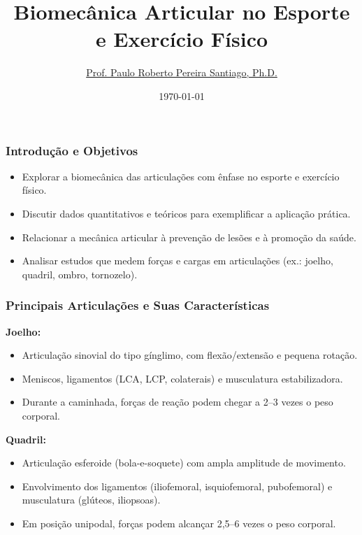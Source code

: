 \documentclass{beamer}
\title{Biomecânica Articular no Esporte e Exercício Físico}
\author{\href{https://uspdigital.usp.br/jupiterweb/obterDisciplina?sgldis=REF0158&verdis=1}{Prof. Paulo Roberto Pereira Santiago, Ph.D.}}
\date{\today}
\begin{document}
\frame{\titlepage}

\begin{frame}
\frametitle{Introdução e Objetivos}
\begin{itemize}
    \item Explorar a biomecânica das articulações com ênfase no esporte e exercício físico.
    \item Discutir dados quantitativos e teóricos para exemplificar a aplicação prática.
    \item Relacionar a mecânica articular à prevenção de lesões e à promoção da saúde.
    \item Analisar estudos que medem forças e cargas em articulações (ex.: joelho, quadril, ombro, tornozelo).
\end{itemize}
\end{frame}

\begin{frame}
\frametitle{Principais Articulações e Suas Características}
\textbf{Joelho:}
\begin{itemize}
    \item Articulação sinovial do tipo gínglimo, com flexão/extensão e pequena rotação.
    \item Meniscos, ligamentos (LCA, LCP, colaterais) e musculatura estabilizadora.
    \item Durante a caminhada, forças de reação podem chegar a 2–3 vezes o peso corporal.
\end{itemize}
\vspace{0.3cm}
\textbf{Quadril:}
\begin{itemize}
    \item Articulação esferoide (bola-e-soquete) com ampla amplitude de movimento.
    \item Envolvimento dos ligamentos (iliofemoral, isquiofemoral, pubofemoral) e musculatura (glúteos, iliopsoas).
    \item Em posição unipodal, forças podem alcançar 2,5–6 vezes o peso corporal.
\end{itemize}
\end{frame}
\end{document}
